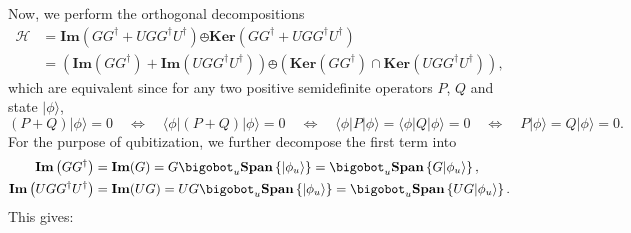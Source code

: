 \documentclass[letterpaper,onecolumn,11pt,accepted=2026-02-14]{quantumarticle}
\theoremstyle{remark}
\theoremstyle{plain}
\newcommand{\ket}[1]{|#1\rangle}
\newcommand{\bra}[1]{\langle#1|}
\begin{document}
Now, we perform the orthogonal decompositions
\begin{equation}
\begin{aligned}
    \mathcal{H}&=\mathbf{Im}\left(GG^\dagger+UGG^\dagger U^\dagger\right)\obot\mathbf{Ker}\left(GG^\dagger+UGG^\dagger U^\dagger\right)\\
    &=\left(\mathbf{Im}\left(GG^\dagger\right)+\mathbf{Im}\left(UGG^\dagger U^\dagger\right)\right)
    \obot\left(\mathbf{Ker}\left(GG^\dagger\right)\cap\mathbf{Ker}\left(UGG^\dagger U^\dagger\right)\right),
\end{aligned}
\end{equation}
which are equivalent since for any two positive semidefinite operators $P$, $Q$ and state $\ket{\phi}$,
\begin{equation}
    (P+Q)\ket{\phi}=0
    \quad\Leftrightarrow\quad
    \bra{\phi}(P+Q)\ket{\phi}=0
    \quad\Leftrightarrow\quad
    \bra{\phi}P\ket{\phi}=\bra{\phi}Q\ket{\phi}=0
    \quad\Leftrightarrow\quad
    P\ket{\phi}=Q\ket{\phi}=0.
\end{equation}
For the purpose of qubitization, we further decompose the first term into
\begin{equation}
\begin{aligned}
    \mathbf{Im}\left(GG^\dagger\right)&=\mathbf{Im}(G)=G\bigobot_{u}\mathbf{Span}\left\{\ket{\phi_u}\right\}=\bigobot_{u}\mathbf{Span}\left\{G\ket{\phi_u}\right\},\\
    \mathbf{Im}\left(UGG^\dagger U^\dagger\right)
    &=\mathbf{Im}(UG)=UG\bigobot_{u}\mathbf{Span}\left\{\ket{\phi_u}\right\}=\bigobot_{u}\mathbf{Span}\left\{UG\ket{\phi_u}\right\}.
\end{aligned}
\end{equation}
This gives:
\end{document}
